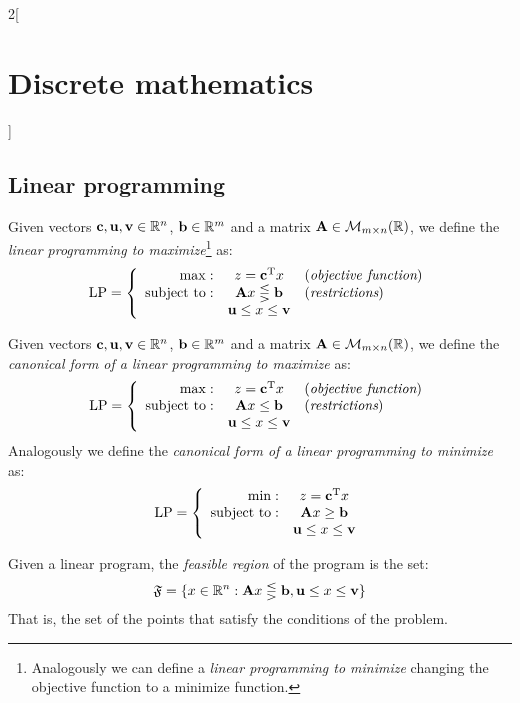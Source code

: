 \documentclass[../../../main.tex]{subfiles}
\begin{document}
\begin{multicols}{2}[\section{Discrete mathematics}]
  \subsection{Linear programming}
  \begin{definition}
    Given vectors $\boldsymbol{\mathrm{c}},\boldsymbol{\mathrm{u}},\boldsymbol{\mathrm{v}}\in\mathbb{R} ^n$, $\boldsymbol{\mathrm{b}}\in\mathbb{R} ^m$ and a matrix $\boldsymbol{\mathrm{A}}\in\mathcal{M}_{m\times n}(\mathbb{R} )$, we define the \emph{linear programming to maximize}\footnote{Analogously we can define a \emph{linear programming to minimize} changing the objective function to a minimize function.} as: $$\text{LP}=\left\{\begin{array}{rcl}
        \max:              & z=\vb{c}^{\mathrm{T}}x         & (\emph{objective function}) \\
        \text{subject to}: & \boldsymbol{\mathrm{A}}x\lesseqgtr \boldsymbol{\mathrm{b}} & (\emph{restrictions})       \\
                           & \boldsymbol{\mathrm{u}}\leq x\leq \boldsymbol{\mathrm{v}}  &
      \end{array}\right.$$
  \end{definition}
  \begin{definition}
    Given vectors $\boldsymbol{\mathrm{c}},\boldsymbol{\mathrm{u}},\boldsymbol{\mathrm{v}}\in\mathbb{R} ^n$, $\boldsymbol{\mathrm{b}}\in\mathbb{R} ^m$ and a matrix $\boldsymbol{\mathrm{A}}\in\mathcal{M}_{m\times n}(\mathbb{R} )$, we define the \emph{canonical form of a linear programming to maximize} as: $$\text{LP}=\left\{\begin{array}{rcl}
        \max:              & z=\vb{c}^{\mathrm{T}}x        & (\emph{objective function}) \\
        \text{subject to}: & \boldsymbol{\mathrm{A}}x\leq \boldsymbol{\mathrm{b}}      & (\emph{restrictions} )      \\
                           & \boldsymbol{\mathrm{u}}\leq x\leq \boldsymbol{\mathrm{v}} &
      \end{array}\right.$$
    Analogously we define the \emph{canonical form of a linear programming to minimize} as: $$\text{LP}=\left\{\begin{array}{rc}
        \min:              & z=\vb{c}^{\mathrm{T}}x        \\
        \text{subject to}: & \boldsymbol{\mathrm{A}}x\geq \boldsymbol{\mathrm{b}}      \\
                           & \boldsymbol{\mathrm{u}}\leq x\leq \boldsymbol{\mathrm{v}}
      \end{array}\right.$$
  \end{definition}
  \begin{definition}
    Given a linear program, the \emph{feasible region} of the program is the set: $$\mathfrak{F}=\{x\in\mathbb{R} ^n:\boldsymbol{\mathrm{A}}x\lesseqgtr \boldsymbol{\mathrm{b}},\boldsymbol{\mathrm{u}}\leq x\leq \boldsymbol{\mathrm{v}}\}$$ That is, the set of the points that satisfy the conditions of the problem.

\end{definition}
\end{multicols}
\end{document}
